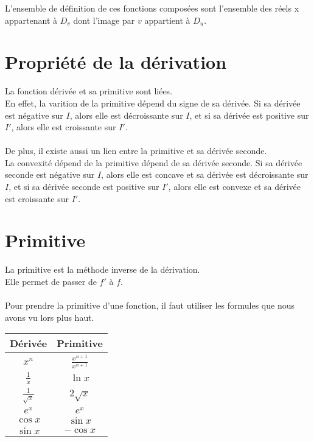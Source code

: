 \documentclass{article}
\begin{document}
	L'ensemble de définition de ces fonctions composées sont l'ensemble des réels x appartenant à $D_v$ dont l'image par $v$ appartient à $D_u$.

	\section{Propriété de la dérivation}

	La fonction dérivée et sa primitive sont liées. \\
	En effet, la varition de la primitive dépend du signe de sa dérivée. Si sa dérivée est négative sur $I$, alors elle est décroissante sur $I$, et si sa dérivée est positive sur $I'$, alors elle est croissante sur $I'$. \\
	\\
	De plus, il existe aussi un lien entre la primitive et sa dérivée seconde. \\
	La convexité dépend de la primitive dépend de sa dérivée seconde. Si sa dérivée seconde est négative sur $I$, alors elle est concave et sa dérivée est décroissante sur $I$, et si sa dérivée seconde est positive sur $I'$, alors elle est convexe et sa dérivée est croissante sur $I'$.

	\section{Primitive}

	La primitive est la méthode inverse de la dérivation. \\
	Elle permet de passer de $f'$ à $f$. \\
	\\
	Pour prendre la primitive d'une fonction, il faut utiliser les formules que nous avons vu lors plus haut.

	\begin{center}
		\begin{tabular}{|c|c|}
	                \hline
		        Dérivée & Primitive \\
			\hline
			$x^n$ & $\frac{x^{n+1}}{x^{n+1}}$ \\
			\hline
			$\frac{1}{x}$ & $\ln x$ \\
			\hline
			$\frac{1}{\sqrt{x}}$ & $2\sqrt{x}$ \\
			\hline
			$e^x$ & $e^x$ \\
			\hline
			$\cos x$ & $\sin x$ \\
			\hline
			$\sin x$ & $-\cos x$ \\
			\hline
		\end{tabular}
	\end{center}
\end{document}
